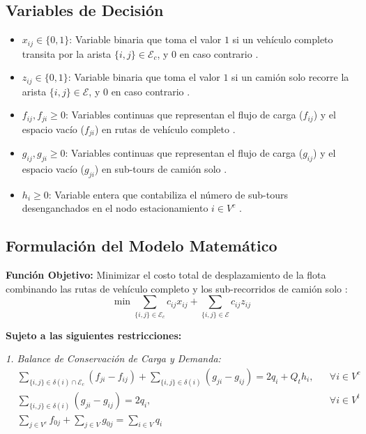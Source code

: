\documentclass[letter, 10pt]{article}
\begin{document}
\subsection{Variables de Decisi\'on}
\begin{itemize}
    \item $x_{ij} \in \{0, 1\}$: Variable binaria que toma el valor $1$ si un veh\'iculo completo transita por la arista $\{i,j\} \in \mathcal{E}_c$, y $0$ en caso contrario \cite{bartolini2020two}.
    \item $z_{ij} \in \{0, 1\}$: Variable binaria que toma el valor $1$ si un cami\'on solo recorre la arista $\{i,j\} \in \mathcal{E}$, y $0$ en caso contrario \cite{bartolini2020two}.
    \item $f_{ij}, f_{ji} \ge 0$: Variables continuas que representan el flujo de carga ($f_{ij}$) y el espacio vac\'io ($f_{ji}$) en rutas de veh\'iculo completo \cite{bartolini2020two}.
    \item $g_{ij}, g_{ji} \ge 0$: Variables continuas que representan el flujo de carga ($g_{ij}$) y el espacio vac\'io ($g_{ji}$) en sub-tours de cami\'on solo \cite{bartolini2020two}.
    \item $h_i \ge 0$: Variable entera que contabiliza el n\'umero de sub-tours desenganchados en el nodo estacionamiento $i \in V^c$ \cite{bartolini2020two}.
\end{itemize}

\subsection{Formulaci\'on del Modelo Matem\'atico}

\textbf{Funci\'on Objetivo:} Minimizar el costo total de desplazamiento de la flota combinando las rutas de veh\'iculo completo y los sub-recorridos de cami\'on solo \cite{bartolini2020two}:
\begin{equation}
\min \sum_{\{i,j\} \in \mathcal{E}_c} c_{ij} x_{ij} + \sum_{\{i,j\} \in \mathcal{E}} c_{ij} z_{ij} \label{eq:obj_main}
\end{equation}

\textbf{Sujeto a las siguientes restricciones:}

\textit{1. Balance de Conservaci\'on de Carga y Demanda:}
\begin{align}
& \sum_{\{i,j\} \in \delta(i) \cap \mathcal{E}_c} (f_{ji} - f_{ij}) + \sum_{\{i,j\} \in \delta(i)} (g_{ji} - g_{ij}) = 2 q_i + Q_t h_i, && \forall i \in V^c \label{eq:m1_flow_vc} \\
& \sum_{\{i,j\} \in \delta(i)} (g_{ji} - g_{ij}) = 2 q_i, && \forall i \in V^t \label{eq:m1_flow_vt} \\
& \sum_{j \in V^c} f_{0j} + \sum_{j \in V} g_{0j} = \sum_{i \in V} q_i && \label{eq:m1_depot}
\end{align}
\end{document}
